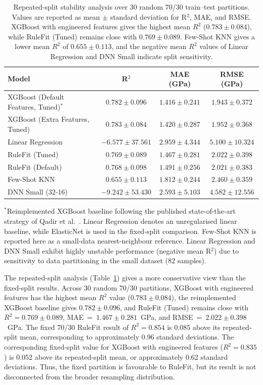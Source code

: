 \documentclass[pdflatex,sn-mathphys-num]{sn-jnl}%
\theoremstyle{thmstyleone}%
\theoremstyle{thmstyletwo}%
\theoremstyle{thmstylethree}%
\begin{document}
\begin{table}[h]
\footnotesize
\centering
\renewcommand{\arraystretch}{1.4}
\caption{Repeated-split stability analysis over 30 random 70/30 train--test partitions. Values are reported as mean $\pm$ standard deviation for R$^2$, MAE, and RMSE. XGBoost with engineered features gives the highest mean $R^2$ ($0.783 \pm 0.084$), while RuleFit (Tuned) remains close with $0.769 \pm 0.089$. Few-Shot KNN gives a lower mean $R^2$ of $0.655 \pm 0.113$, and the negative mean $R^2$ values of Linear Regression and DNN Small indicate split sensitivity.}
\label{tab:stability}
\begin{tabular}{lccc}
\toprule
\textbf{Model} & \textbf{R$^2$} & \textbf{MAE (GPa)} & \textbf{RMSE (GPa)} \\ \midrule
XGBoost (Default Features, Tuned)$^{*}$ & $0.782 \pm 0.096$ & $1.416 \pm 0.241$ & $1.943 \pm 0.372$ \\
XGBoost (Extra Features, Tuned) & $0.783 \pm 0.084$ & $1.420 \pm 0.287$ & $1.952 \pm 0.368$ \\
Linear Regression               & $-6.577 \pm 37.561$ & $2.959 \pm 4.344$ & $5.100 \pm 10.324$ \\
RuleFit (Tuned)                 & $0.769 \pm 0.089$ & $1.467 \pm 0.281$ & $2.022 \pm 0.398$ \\
RuleFit (Default)               & $0.768 \pm 0.098$ & $1.491 \pm 0.256$ & $2.021 \pm 0.383$ \\
Few-Shot KNN                    & $0.655 \pm 0.113$ & $1.812 \pm 0.244$ & $2.460 \pm 0.359$ \\
DNN Small (32-16)               & $-9.242 \pm 53.430$ & $2.593 \pm 5.103$ & $4.582 \pm 12.556$ \\
\bottomrule
\end{tabular}
\vspace{1mm}
\scriptsize{$^{*}$Reimplemented XGBoost baseline following the published state-of-the-art strategy of Qadir et al.~\cite{qadir2024predicting}. Linear Regression denotes an unregularised linear baseline, while ElasticNet is used in the fixed-split comparison. Few-Shot KNN is reported here as a small-data nearest-neighbour reference. Linear Regression and DNN Small exhibit highly unstable performance (negative mean R$^2$) due to sensitivity to data partitioning in the small dataset (82 samples).}
\end{table}
\FloatBarrier

The repeated-split analysis (Table~\ref{tab:stability}) gives a more conservative view than the fixed-split results. Across 30 random 70/30 partitions, XGBoost with engineered features has the highest mean $R^2$ value ($0.783 \pm 0.084$), the reimplemented XGBoost baseline gives $0.782 \pm 0.096$, and RuleFit (Tuned) remains close with $R^2=0.769 \pm 0.089$, MAE~=~$1.467 \pm 0.281$~GPa, and RMSE~=~$2.022 \pm 0.398$~GPa. The fixed 70/30 RuleFit result of $R^2=0.854$ is 0.085 above its repeated-split mean, corresponding to approximately 0.96 standard deviations. The corresponding fixed-split value for XGBoost with engineered features ($R^2=0.835$) is 0.052 above its repeated-split mean, or approximately 0.62 standard deviations. Thus, the fixed partition is favourable to RuleFit, but its result is not disconnected from the broader resampling distribution.
\end{document}

